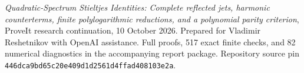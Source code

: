 \emph{Quadratic-Spectrum Stieltjes Identities: Complete reflected jets,
harmonic counterterms, finite polylogarithmic reductions, and a polynomial
parity criterion}, ProveIt research continuation, 10 October 2026.
Prepared for Vladimir Reshetnikov with OpenAI assistance. Full proofs,
517 exact finite checks, and 82 numerical diagnostics in the accompanying
report package. Repository source pin
\texttt{446dca9bd65c20e409d1d2561d4ffad408103e2a}.
